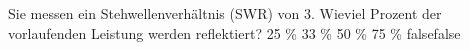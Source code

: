     {Sie messen ein Stehwellenverhältnis (SWR) von 3. Wieviel Prozent der vorlaufenden Leistung werden reflektiert?}
    {25 \%}
    {33 \%}
    {50 \%}
    {75 \%}
    {false}{false}